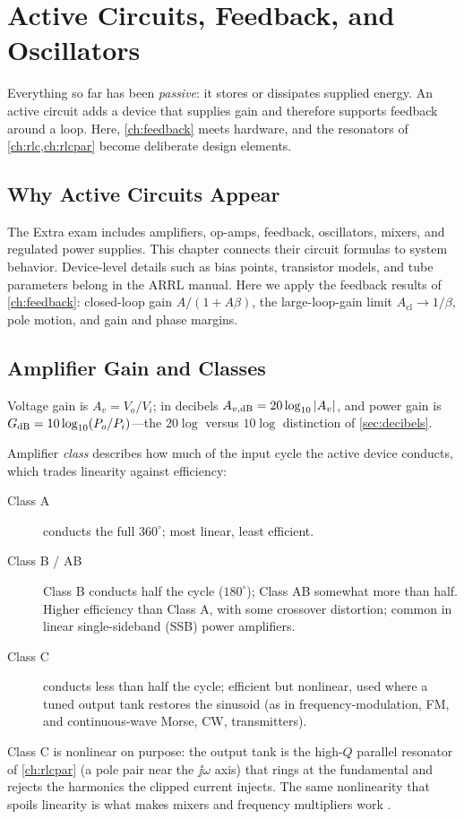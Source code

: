 \chapter{Active Circuits, Feedback, and Oscillators}
\label{ch:active}
Everything so far has been \emph{passive}: it stores or dissipates supplied energy.
An active circuit adds a device that supplies gain and therefore supports feedback
around a loop. Here, \cref{ch:feedback} meets hardware, and the resonators of
\cref{ch:rlc,ch:rlcpar} become deliberate design elements.

\section{Why Active Circuits Appear}
The Extra exam includes amplifiers, op-amps, feedback, oscillators, mixers, and
regulated power supplies. This chapter connects their circuit formulas to system
behavior. Device-level details such as bias points, transistor models, and tube
parameters belong in the ARRL manual. Here we apply the feedback results of
\cref{ch:feedback}: closed-loop gain \(A/(1+A\beta)\), the large-loop-gain limit
\(A_{\text{cl}}\to1/\beta\), pole motion, and gain and phase margins.

\section{Amplifier Gain and Classes}
\label{sec:classes}
Voltage gain is \(A_v=V_o/V_i\); in decibels \(A_{v,\mathrm{dB}}=20\log_{10}|A_v|\), and power
gain is \(G_{\mathrm{dB}}=10\log_{10}(P_o/P_i)\)---the \(20\log\) versus \(10\log\)
distinction of \cref{sec:decibels}.

Amplifier \emph{class} describes how much of the input cycle the active device
conducts, which trades linearity against efficiency:
\begin{description}
\item[Class A] conducts the full \(360^\circ\); most linear, least efficient.
\item[Class B / AB] Class B conducts half the cycle (\(180^\circ\)); Class AB
somewhat more than half. Higher efficiency than Class A, with some crossover
distortion; common in linear single-sideband (SSB) power amplifiers.
\item[Class C] conducts less than half the cycle; efficient but nonlinear, used
where a tuned output tank restores the sinusoid (as in frequency-modulation, FM,
and continuous-wave Morse, CW, transmitters).
\end{description}
Class C is nonlinear on purpose: the output tank is the high-\(Q\) parallel resonator
of \cref{ch:rlcpar} (a pole pair near the \(\jj\omega\) axis) that rings at the
fundamental and rejects the harmonics the clipped current injects. The same nonlinearity that spoils
linearity is what makes mixers and frequency multipliers work
\cite[pp.~208--223]{davis2011rfcircuit}.

